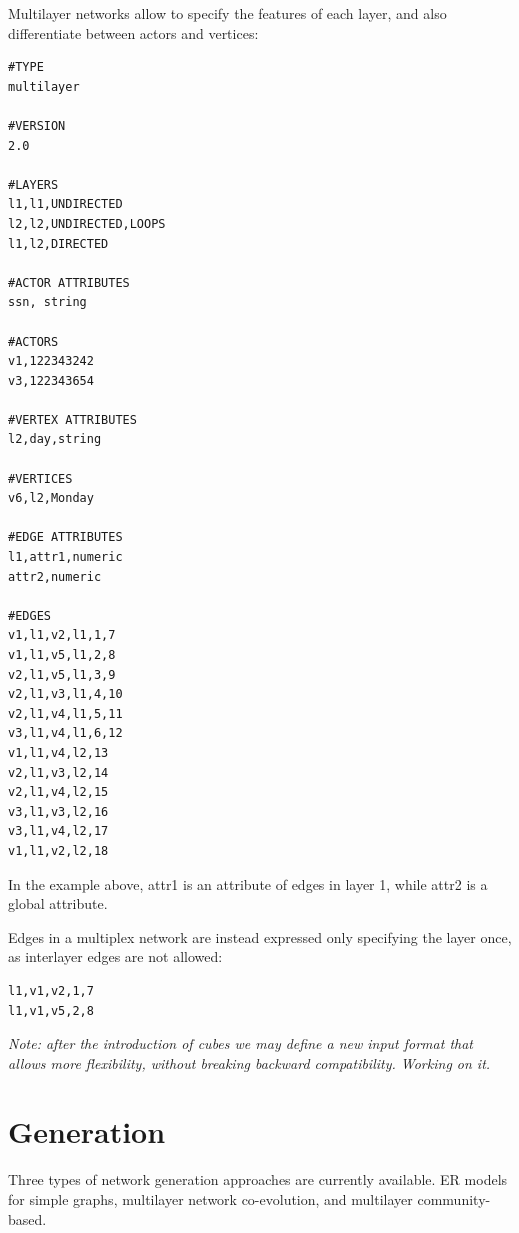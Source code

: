 Multilayer networks allow to specify the features of each layer, and also differentiate between actors and vertices:
\begin{lstlisting}[style=file]
#TYPE                
multilayer           
                     
#VERSION             
2.0                  
                     
#LAYERS              
l1,l1,UNDIRECTED     
l2,l2,UNDIRECTED,LOOPS
l1,l2,DIRECTED       
                     
#ACTOR ATTRIBUTES    
ssn, string          
                     
#ACTORS              
v1,122343242         
v3,122343654         
                     
#VERTEX ATTRIBUTES   
l2,day,string        
                     
#VERTICES            
v6,l2,Monday         
                     
#EDGE ATTRIBUTES     
l1,attr1,numeric 
attr2,numeric   
                     
#EDGES               
v1,l1,v2,l1,1,7      
v1,l1,v5,l1,2,8      
v2,l1,v5,l1,3,9      
v2,l1,v3,l1,4,10     
v2,l1,v4,l1,5,11     
v3,l1,v4,l1,6,12     
v1,l1,v4,l2,13       
v2,l1,v3,l2,14       
v2,l1,v4,l2,15       
v3,l1,v3,l2,16       
v3,l1,v4,l2,17       
v1,l1,v2,l2,18       
\end{lstlisting}
In the example above, attr1 is an attribute of edges in layer 1, while attr2 is a global attribute.


Edges in a multiplex network are instead expressed only specifying the layer once, as interlayer edges are not allowed:

\begin{lstlisting}[style=file]              
l1,v1,v2,1,7      
l1,v1,v5,2,8  
\end{lstlisting}

\emph{Note: after the introduction of cubes we may define a new input format that allows more flexibility, without breaking backward compatibility. Working on it.}

\section{Generation}  \label{ch:generation}

Three types of network generation approaches are currently available. ER models for simple graphs, multilayer network co-evolution, and multilayer community-based.

